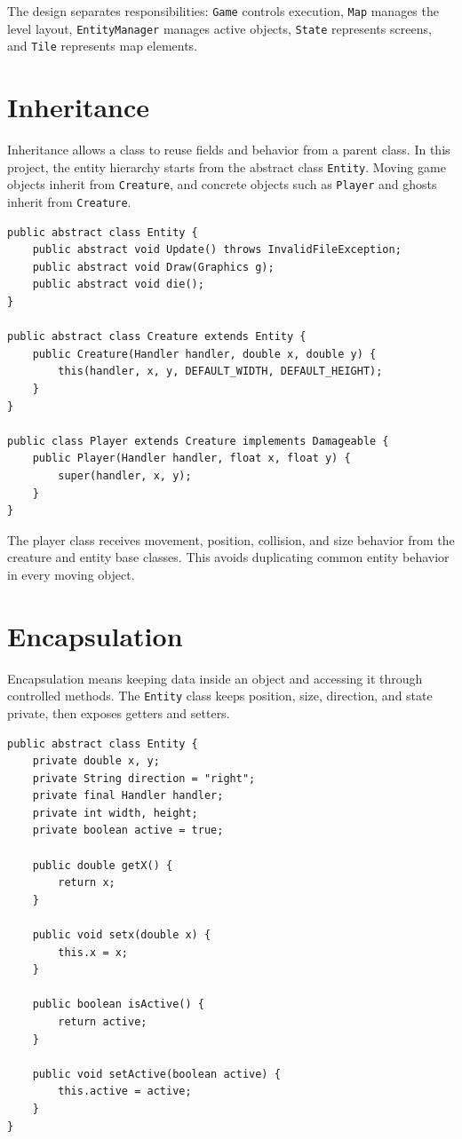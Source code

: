 \documentclass[12pt,a4paper]{article}
\begin{document}
The design separates responsibilities: \texttt{Game} controls execution, \texttt{Map} manages the level layout, \texttt{EntityManager} manages active objects, \texttt{State} represents screens, and \texttt{Tile} represents map elements.

\section{Inheritance}

Inheritance allows a class to reuse fields and behavior from a parent class. In this project, the entity hierarchy starts from the abstract class \texttt{Entity}. Moving game objects inherit from \texttt{Creature}, and concrete objects such as \texttt{Player} and ghosts inherit from \texttt{Creature}.

\begin{lstlisting}
public abstract class Entity {
    public abstract void Update() throws InvalidFileException;
    public abstract void Draw(Graphics g);
    public abstract void die();
}

public abstract class Creature extends Entity {
    public Creature(Handler handler, double x, double y) {
        this(handler, x, y, DEFAULT_WIDTH, DEFAULT_HEIGHT);
    }
}

public class Player extends Creature implements Damageable {
    public Player(Handler handler, float x, float y) {
        super(handler, x, y);
    }
}
\end{lstlisting}

The player class receives movement, position, collision, and size behavior from the creature and entity base classes. This avoids duplicating common entity behavior in every moving object.

\section{Encapsulation}

Encapsulation means keeping data inside an object and accessing it through controlled methods. The \texttt{Entity} class keeps position, size, direction, and state private, then exposes getters and setters.

\begin{lstlisting}
public abstract class Entity {
    private double x, y;
    private String direction = "right";
    private final Handler handler;
    private int width, height;
    private boolean active = true;

    public double getX() {
        return x;
    }

    public void setx(double x) {
        this.x = x;
    }

    public boolean isActive() {
        return active;
    }

    public void setActive(boolean active) {
        this.active = active;
    }
}
\end{lstlisting}
\end{document}
